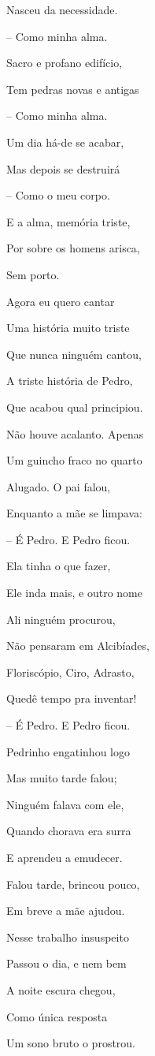 Nasceu da necessidade.

-- Como minha alma.

Sacro e profano edifício,

Tem pedras novas e antigas

-- Como minha alma.

Um dia há-de se acabar,

Mas depois se destruirá

-- Como o meu corpo.

E a alma, memória triste,

Por sobre os homens arisca,

Sem porto.

Agora eu quero cantar

Uma história muito triste

Que nunca ninguém cantou,

A triste história de Pedro,

Que acabou qual principiou.

Não houve acalanto. Apenas

Um guincho fraco no quarto

Alugado. O pai falou,

Enquanto a mãe se limpava:

-- É Pedro. E Pedro ficou.

Ela tinha o que fazer,

Ele inda mais, e outro nome

Ali ninguém procurou,

Não pensaram em Alcibíades,

Floriscópio, Ciro, Adrasto,

Quedê tempo pra inventar!

-- É Pedro. E Pedro ficou.

Pedrinho engatinhou logo

Mas muito tarde falou;

Ninguém falava com ele,

Quando chorava era surra

E aprendeu a emudecer.

Falou tarde, brincou pouco,

Em breve a mãe ajudou.

Nesse trabalho insuspeito

Passou o dia, e nem bem

A noite escura chegou,

Como única resposta

Um sono bruto o prostrou.

